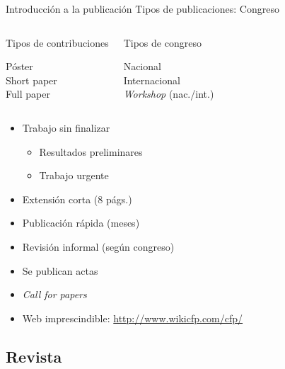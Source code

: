 \documentclass{beamer}
\begin{document}
\begin{frame}{Introducción a la publicación} {Tipos de publicaciones: Congreso}
	\begin{columns}
			\begin{block}{Tipos de contribuciones}
				\begin{center}
					Póster\\
					Short paper\\
					Full paper
				\end{center}
			\end{block}

			\begin{block}{Tipos de congreso}
				\begin{center}
				Nacional\\
			 	Internacional\\
				\textit{Workshop} (nac./int.)
				\end{center}
			\end{block}
		\end{columns}

		\begin{itemize}
			\item Trabajo sin finalizar
			\begin{itemize}
				\item Resultados preliminares
				\item Trabajo urgente
			\end{itemize}
			\item Extensión corta (8 págs.)
			\item Publicación rápida (meses)
			\item Revisión informal (según congreso)
			\item Se publican actas
			\item \textit{Call for papers}
			\item Web imprescindible: \url{http://www.wikicfp.com/cfp/}
 		\end{itemize}
\end{frame}

\subsection{Revista}
\end{document}
